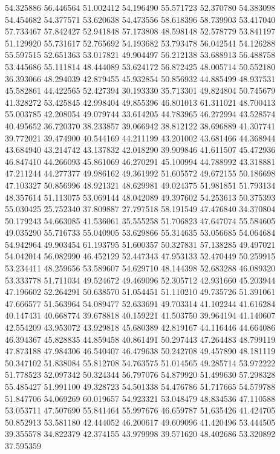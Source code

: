 54.325886
56.446564
51.002412
54.196490
55.571723
52.370780
54.383098
54.454682
54.377571
53.620638
54.473556
58.618396
58.739903
53.417040
57.733467
57.842427
52.941848
57.173808
48.598148
52.578779
53.841197
51.129920
55.731617
52.765692
54.193682
53.793478
56.042541
54.126288
55.597515
52.651363
53.017821
49.904497
56.212138
53.688913
56.488758
53.445686
55.111814
48.444089
53.624172
56.872425
48.005714
50.552180
36.393066
48.294039
42.879455
45.932854
50.856932
44.885499
48.937531
45.582861
44.422565
52.427394
30.193330
35.713301
49.824804
50.745679
41.328272
53.425845
42.998404
49.855396
46.801013
61.311021
48.700413
55.003785
42.208054
49.079744
33.614205
44.783965
46.272994
43.528574
40.495652
36.720370
38.233857
39.066942
38.812122
38.696889
41.307741
39.772021
39.474900
40.544169
44.211199
43.201002
43.681466
44.368944
43.684940
43.214742
43.137832
42.018290
39.909846
41.611507
45.472936
46.847410
44.266093
45.861069
46.270291
45.100994
44.788992
43.318881
47.211244
44.277377
49.986162
49.361992
51.605572
49.672155
50.186698
47.103327
50.856996
48.921321
48.629981
49.024375
51.981851
51.793134
48.357614
51.113075
53.069144
48.042089
49.397602
54.253613
50.375393
55.030425
25.752340
37.809887
27.797518
58.191549
47.476840
34.370804
50.179243
54.663085
41.536061
35.555258
51.706823
47.647074
55.584605
49.035290
55.716733
55.040905
53.629866
55.314635
53.056685
54.064684
54.942964
49.903454
61.193795
51.600357
50.327831
57.138285
49.497021
54.042014
56.082990
46.452129
52.447343
47.953133
52.470449
50.259915
53.234411
48.259656
53.589607
54.629710
48.144398
52.683288
46.089320
53.333778
51.711034
49.524672
49.469096
52.305712
42.931660
45.203944
47.196602
52.264291
50.638570
51.054451
51.110210
49.735726
51.391061
47.666577
51.563964
54.089477
52.633691
49.703314
41.102244
41.616284
40.147431
40.668774
39.678818
40.159221
41.503750
39.964194
41.140607
42.554209
43.953072
43.929818
45.680389
42.819167
44.116446
44.664086
46.394367
45.828835
44.859458
40.861491
50.297443
47.264483
48.799119
47.873188
47.984306
46.540407
46.479638
50.242708
49.457890
48.181119
50.347102
51.838084
55.812708
54.763575
51.014565
49.285714
53.972222
51.778523
52.097342
50.324344
56.797076
54.879920
51.499630
57.298328
55.485427
51.991100
49.328723
54.501338
54.476786
51.717665
54.579788
51.847706
54.069269
60.019657
54.923321
53.048479
48.834536
47.110588
53.053711
47.507690
55.841464
55.997676
46.659787
51.635426
41.424705
50.852913
53.581180
42.444052
46.200617
49.609096
41.420496
53.444505
39.355578
34.822379
42.374155
43.979998
39.571620
48.402686
53.320892
37.595359
